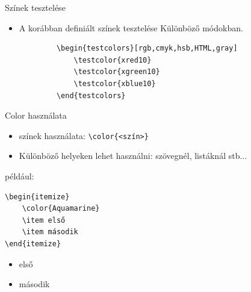 \documentclass[aspectratio=1610, dvipsnames, xcolor=table]{beamer}
\begin{document}
    \begin{frame}[fragile]{Színek tesztelése}
        \begin{itemize}
            \item {} A korábban definiált színek tesztelése Különböző módokban.
        \end{itemize}
        \begin{verbatim}
            \begin{testcolors}[rgb,cmyk,hsb,HTML,gray]
                \testcolor{xred10}
                \testcolor{xgreen10}
                \testcolor{xblue10}
            \end{testcolors}    
        \end{verbatim}
        \begin{testcolors}
        \end{testcolors}
    \end{frame}

    \begin{frame}[fragile]{Color használata}
        \begin{minipage}{0.6\textwidth}
            \begin{itemize}            
                \item {} színek használata: \verb!\color{<szín>}!
                \item {} Különböző helyeken lehet használni: szövegnél, listáknál stb...    
            \end{itemize}
        \end{minipage}
        \begin{minipage}{0.35\textwidth}
            
                 például:
                 \begin{verbatim}\begin{itemize}
    \color{Aquamarine}
    \item első
    \item második
\end{itemize}\end{verbatim}
                  \begin{itemize}
                    \color{Aquamarine}
                    \item első
                    \item második
                \end{itemize}
        \end{minipage}
    \end{frame}
       
\end{document}

